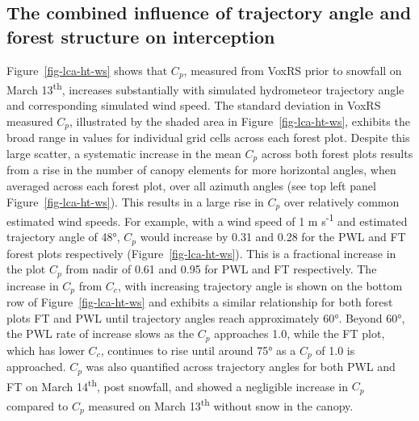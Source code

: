 \documentclass[
  letterpaper,
  DIV=11,
  numbers=noendperiod]{scrartcl}
\begin{document}
\subsection{The combined influence of trajectory angle and forest
structure on
interception}\label{the-combined-influence-of-trajectory-angle-and-forest-structure-on-interception}

Figure~\ref{fig-lca-ht-ws} shows that \(C_p\), measured from VoxRS prior
to snowfall on March 13\textsuperscript{th}, increases substantially
with simulated hydrometeor trajectory angle and corresponding simulated
wind speed. The standard deviation in VoxRS measured \(C_p\),
illustrated by the shaded area in Figure~\ref{fig-lca-ht-ws}, exhibits
the broad range in values for individual grid cells across each forest
plot. Despite this large scatter, a systematic increase in the mean
\(C_p\) across both forest plots results from a rise in the number of
canopy elements for more horizontal angles, when averaged across each
forest plot, over all azimuth angles (see top left panel
Figure~\ref{fig-lca-ht-ws}). This results in a large rise in \(C_p\)
over relatively common estimated wind speeds. For example, with a wind
speed of 1 m s\textsuperscript{-1} and estimated trajectory angle of
48°, \(C_p\) would increase by 0.31 and 0.28 for the PWL and FT forest
plots respectively (Figure~\ref{fig-lca-ht-ws}). This is a fractional
increase in the plot \(C_p\) from nadir of 0.61 and 0.95 for PWL and FT
respectively. The increase in \(C_p\) from \(C_c\), with increasing
trajectory angle is shown on the bottom row of
Figure~\ref{fig-lca-ht-ws} and exhibits a similar relationship for both
forest plots FT and PWL until trajectory angles reach approximately 60°.
Beyond 60°, the PWL rate of increase slows as the \(C_p\) approaches
1.0, while the FT plot, which has lower \(C_c\), continues to rise until
around 75° as a \(C_p\) of 1.0 is approached. \(C_p\) was also
quantified across trajectory angles for both PWL and FT on March
14\textsuperscript{th}, post snowfall, and showed a negligible increase
in \(C_p\) compared to \(C_p\) measured on March 13\textsuperscript{th}
without snow in the canopy.
\end{document}
